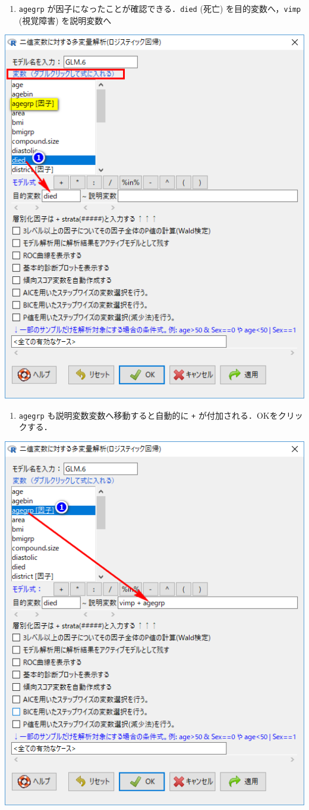 \documentclass[11pt,]{problemset}
\providecommand{\tightlist}{%
  \setlength{\itemsep}{0pt}\setlength{\parskip}{0pt}}
\begin{document}
\begin{enumerate}
\def\labelenumi{\arabic{enumi}.}
\setcounter{enumi}{1}
\tightlist
\item
  \texttt{agegrp} が因子になったことが確認できる．\newline \texttt{died}
  (死亡) を目的変数へ，\texttt{vimp} (視覚障害) を説明変数へ
\end{enumerate}

\begin{center}\includegraphics[width=0.5\linewidth,height=0.5\textheight]{pic/mltlogstic05} \end{center}

\begin{enumerate}
\def\labelenumi{\arabic{enumi}.}
\setcounter{enumi}{2}
\tightlist
\item
  \texttt{agegrp} も説明変数変数へ移動すると自動的に \texttt{+}
  が付加される．OKをクリックする．
\end{enumerate}

\begin{center}\includegraphics[width=0.5\linewidth,height=0.5\textheight]{pic/mltlogstic06} \end{center}
\end{document}
